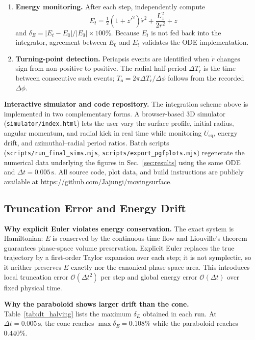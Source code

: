 \documentclass[11pt,letterpaper]{article}
\newcommand{\parhead}[1]{\par\medskip\noindent\textbf{#1}\ignorespaces}
\begin{document}
\begin{enumerate}[leftmargin=2em, itemsep=0.7em, topsep=0.5em, label=\textbf{\arabic*.}]
    \item \textbf{Energy monitoring.}
    After each step, independently compute
    \begin{equation*}
        E_t = \tfrac{1}{2}(1+z'^2)\dot{r}^2 + \frac{L_z^2}{2r^2} + z
    \end{equation*}
    and $\delta_E=|E_t-E_0|/|E_0|\times 100\%$. Because $E_t$ is not fed back into the integrator, agreement between $E_0$ and $E_t$ validates the ODE implementation.

    \item \textbf{Turning-point detection.}
    Periapsis events are identified when $\dot{r}$ changes sign from non-positive to positive. The radial half-period $\Delta T_r$ is the time between consecutive such events; $T_a=2\pi\Delta T_r/\Delta\phi$ follows from the recorded $\Delta\phi$.
\end{enumerate}

\parhead{Interactive simulator and code repository.}
The integration scheme above is implemented in two complementary forms. A browser-based 3D simulator (\texttt{simulator/index.html}) lets the user vary the surface profile, initial radius, angular momentum, and radial kick in real time while monitoring $U_{\mathrm{eq}}$, energy drift, and azimuthal--radial period ratios. Batch scripts (\texttt{scripts/run\_final\_sims.mjs}, \texttt{scripts/export\_pgfplots.mjs}) regenerate the numerical data underlying the figures in Sec.~\ref{sec:results} using the same ODE and $\Delta t=0.005\,\mathrm{s}$. All source code, plot data, and build instructions are publicly available at \url{https://github.com/Jajungi/movingsurface}.

\subsection{Truncation Error and Energy Drift}
\label{sec:error}

\parhead{Why explicit Euler violates energy conservation.}
The exact system is Hamiltonian: $E$ is conserved by the continuous-time flow and Liouville's theorem guarantees phase-space volume preservation. Explicit Euler replaces the true trajectory by a first-order Taylor expansion over each step; it is not symplectic, so it neither preserves $E$ exactly nor the canonical phase-space area. This introduces local truncation error $\mathcal{O}(\Delta t^2)$ per step and global energy error $\mathcal{O}(\Delta t)$ over fixed physical time.

\parhead{Why the paraboloid shows larger drift than the cone.}
Table~\ref{tab:dt_halving} lists the maximum $\delta_E$ obtained in each run. At $\Delta t=0.005\,\mathrm{s}$, the cone reaches $\max\delta_E=0.108\%$ while the paraboloid reaches $0.440\%$.
\end{document}
